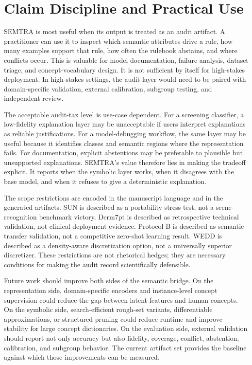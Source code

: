 \documentclass[make,supfile,submit,pdftex,moreauthors]{Definitions/mdpi}
\begin{document}
\section{Claim Discipline and Practical Use}
\label{sec:supp_claim_discipline}

SEMTRA is most useful when its output is treated as an audit artifact. A practitioner can use it to inspect which semantic attributes drive a rule, how many examples support that rule, how often the rulebook abstains, and where conflicts occur. This is valuable for model documentation, failure analysis, dataset triage, and concept-vocabulary design. It is not sufficient by itself for high-stakes deployment. In high-stakes settings, the audit layer would need to be paired with domain-specific validation, external calibration, subgroup testing, and independent review.

The acceptable audit-tax level is use-case dependent. For a screening classifier, a low-fidelity explanation layer may be unacceptable if users interpret explanations as reliable justifications. For a model-debugging workflow, the same layer may be useful because it identifies classes and semantic regions where the representation fails. For documentation, explicit abstentions may be preferable to plausible but unsupported explanations. SEMTRA's value therefore lies in making the tradeoff explicit. It reports when the symbolic layer works, when it disagrees with the base model, and when it refuses to give a deterministic explanation.

The scope restrictions are encoded in the manuscript language and in the generated artifacts. SUN is described as a portability stress test, not a scene-recognition benchmark victory. Derm7pt is described as retrospective technical validation, not clinical deployment evidence. Protocol B is described as semantic-transfer validation, not a competitive zero-shot learning result. WEDD is described as a density-aware discretization option, not a universally superior discretizer. These restrictions are not rhetorical hedges; they are necessary conditions for making the audit record scientifically defensible.

Future work should improve both sides of the semantic bridge. On the representation side, domain-specific encoders and instance-level concept supervision could reduce the gap between latent features and human concepts. On the symbolic side, search-efficient rough-set variants, differentiable approximations, or structured pruning could reduce runtime and improve stability for large concept dictionaries. On the evaluation side, external validation should report not only accuracy but also fidelity, coverage, conflict, abstention, calibration, and subgroup behavior. The current artifact set provides the baseline against which those improvements can be measured.
\end{document}
